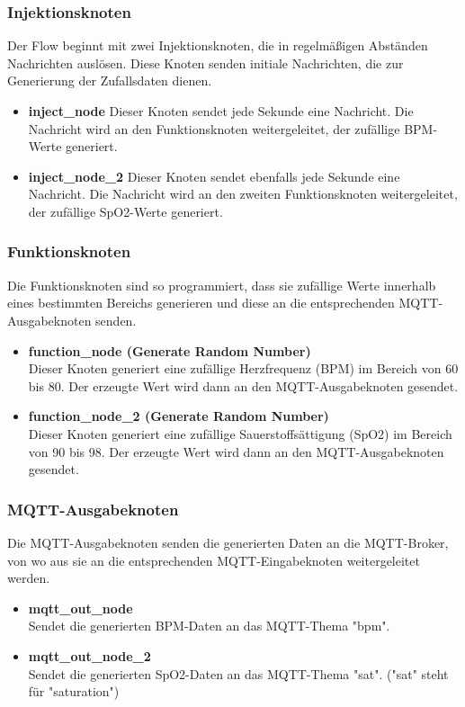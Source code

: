 \documentclass[conference,a4paper,flushend]{cs-techrep}
\begin{document}
\subsubsection{Injektionsknoten}
Der Flow beginnt mit zwei Injektionsknoten, die in regelmäßigen Abständen Nachrichten auslösen. Diese Knoten senden initiale Nachrichten, die zur Generierung der Zufallsdaten dienen.
\begin{itemize}
\vspace{0.5em}
\item\textbf {inject\_node}
Dieser Knoten sendet jede Sekunde eine Nachricht. Die Nachricht wird an den Funktionsknoten weitergeleitet, der zufällige BPM-Werte generiert.
\vspace{0.5em}
\item\textbf {inject\_node\_2} 
Dieser Knoten sendet ebenfalls jede Sekunde eine Nachricht. Die Nachricht wird an den zweiten Funktionsknoten weitergeleitet, der zufällige SpO2-Werte generiert.
\vspace{0.5em}
\end{itemize}

\subsubsection{Funktionsknoten}
Die Funktionsknoten sind so programmiert, dass sie zufällige Werte innerhalb eines bestimmten Bereichs generieren und diese an die entsprechenden MQTT-Ausgabeknoten senden.
\begin{itemize}
\vspace{0.5em}
\item\textbf {function\_node (Generate Random Number)}\\
Dieser Knoten generiert eine zufällige Herzfrequenz (BPM) im Bereich von 60 bis 80. Der erzeugte Wert wird dann an den MQTT-Ausgabeknoten gesendet.
\vspace{0.5em}
\item\textbf {function\_node\_2 (Generate Random Number)}\\
Dieser Knoten generiert eine zufällige Sauerstoffsättigung (SpO2) im Bereich von 90 bis 98. Der erzeugte Wert wird dann an den MQTT-Ausgabeknoten gesendet. 
\vspace{0.5em}
\end{itemize}

\subsubsection{MQTT-Ausgabeknoten}
Die MQTT-Ausgabeknoten senden die generierten Daten an die MQTT-Broker, von wo aus sie an die entsprechenden MQTT-Eingabeknoten weitergeleitet werden.
\begin{itemize}
\item\textbf {mqtt\_out\_node}\\
Sendet die generierten BPM-Daten an das MQTT-Thema "bpm".
\vspace{0.5em}
\item\textbf {mqtt\_out\_node\_2}\\
Sendet die generierten SpO2-Daten an das MQTT-Thema "sat". ("sat" steht für "saturation")
\vspace{0.5em}
\end{itemize}
\end{document}
